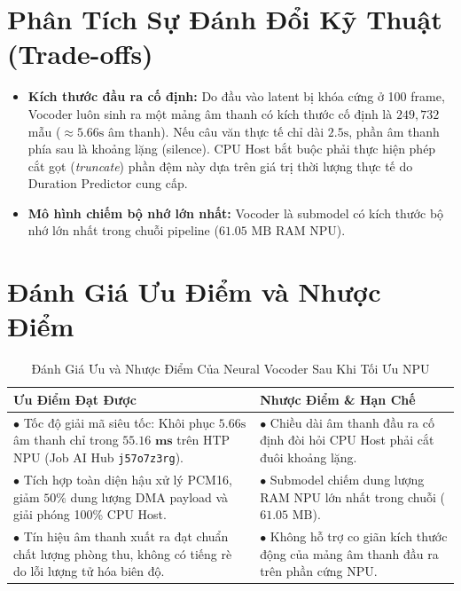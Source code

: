 \documentclass[11pt,a4paper,oneside,table]{report}
\begin{document}
\section{Phân Tích Sự Đánh Đổi Kỹ Thuật (Trade-offs)}
\begin{itemize}
    \item \textbf{Kích thước đầu ra cố định:} Do đầu vào latent bị khóa cứng ở 100 frame, Vocoder luôn sinh ra một mảng âm thanh có kích thước cố định là $249,732$ mẫu ($\approx 5.66\text{s}$ âm thanh). Nếu câu văn thực tế chỉ dài $2.5\text{s}$, phần âm thanh phía sau là khoảng lặng (silence). CPU Host bắt buộc phải thực hiện phép cắt gọt (\textit{truncate}) phần đệm này dựa trên giá trị thời lượng thực tế do Duration Predictor cung cấp.
    \item \textbf{Mô hình chiếm bộ nhớ lớn nhất:} Vocoder là submodel có kích thước bộ nhớ lớn nhất trong chuỗi pipeline ($61.05\text{ MB}$ RAM NPU).
\end{itemize}

\section{Đánh Giá Ưu Điểm và Nhược Điểm}
\begin{table}[H]
\centering
\small
\sffamily
\caption{Đánh Giá Ưu và Nhược Điểm Của Neural Vocoder Sau Khi Tối Ưu NPU}
\label{tab:vocoder_pros_cons}
\vspace{2mm}
\begin{tabularx}{\textwidth}{p{7.5cm} p{7.5cm}}
\toprule
\textbf{Ưu Điểm Đạt Được} & \textbf{Nhược Điểm \& Hạn Chế} \\
\midrule
$\bullet$ Tốc độ giải mã siêu tốc: Khôi phục $5.66\text{s}$ âm thanh chỉ trong $\mathbf{55.16\text{ ms}}$ trên HTP NPU (Job AI Hub \texttt{j57o7z3rg}). & $\bullet$ Chiều dài âm thanh đầu ra cố định đòi hỏi CPU Host phải cắt đuôi khoảng lặng. \\
\addlinespace
$\bullet$ Tích hợp toàn diện hậu xử lý PCM16, giảm $50\%$ dung lượng DMA payload và giải phóng 100\% CPU Host. & $\bullet$ Submodel chiếm dung lượng RAM NPU lớn nhất trong chuỗi ($61.05\text{ MB}$). \\
\addlinespace
$\bullet$ Tín hiệu âm thanh xuất ra đạt chuẩn chất lượng phòng thu, không có tiếng rè do lỗi lượng tử hóa biên độ. & $\bullet$ Không hỗ trợ co giãn kích thước động của mảng âm thanh đầu ra trên phần cứng NPU. \\
\bottomrule
\end{tabularx}
\end{table}
\end{document}
